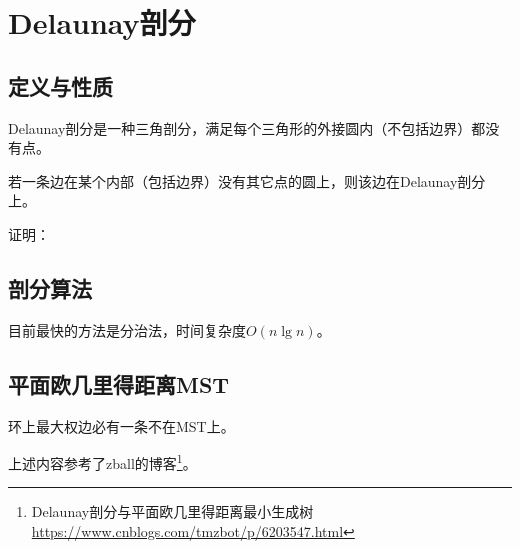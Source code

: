 \section{Delaunay剖分}
\subsection{定义与性质}
Delaunay剖分是一种三角剖分，满足每个三角形的外接圆内（不包括边界）都没有点。

\begin{property}
    若一条边在某个内部（包括边界）没有其它点的圆上，则该边在Delaunay剖分上。
\end{property}
证明：

\subsection{剖分算法}
目前最快的方法是分治法，时间复杂度$O(n\lg n)$。

\subsection{平面欧几里得距离MST}
\begin{property}
    环上最大权边必有一条不在MST上。
\end{property}

上述内容参考了zball的博客\footnote{
    Delaunay剖分与平面欧几里得距离最小生成树
    \url{https://www.cnblogs.com/tmzbot/p/6203547.html}
}。
